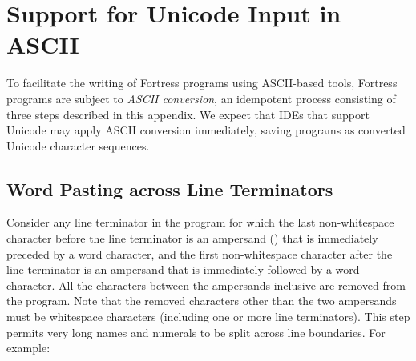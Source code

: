 %
%
%
%

\chapter{Support for Unicode Input in ASCII}



To facilitate the writing of Fortress programs
using ASCII-based tools,
Fortress programs are subject to \emph{ASCII conversion},
an idempotent process consisting of three steps
described in this appendix.
We expect that IDEs that support Unicode
may apply ASCII conversion immediately,
saving programs as converted Unicode character sequences.


\section{Word Pasting across Line Terminators}

Consider any line terminator in the program
for which the last non-whitespace character before the line terminator
is an ampersand (\txt{\&}) that is immediately preceded by a word character,
and the first non-whitespace character after the line terminator
is an ampersand that is immediately followed by a word character.
All the characters between the ampersands inclusive
are removed from the program.
Note that the removed characters other than the two ampersands
must be whitespace characters
(including one or more line terminators).
This step permits very long names and numerals
to be split across line boundaries.
For example:


